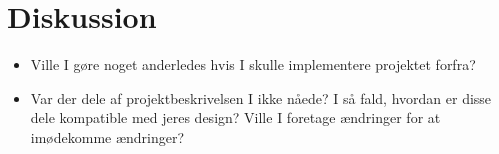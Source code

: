 \documentclass{article}
\theoremstyle{mytheoremstyle}
\theoremstyle{mytheoremstyle}
\theoremstyle{myproblemstyle}
\begin{document}
\section{Diskussion}\label{sec:Diskussion} %
\begin{itemize}
  \item Ville I gøre noget anderledes hvis I skulle implementere projektet
  forfra?
  \item Var der dele af projektbeskrivelsen I ikke nåede? I så fald, hvordan er
  disse dele kompatible med jeres design? Ville I foretage ændringer for at
  imødekomme ændringer?
\end{itemize}
\end{document}
